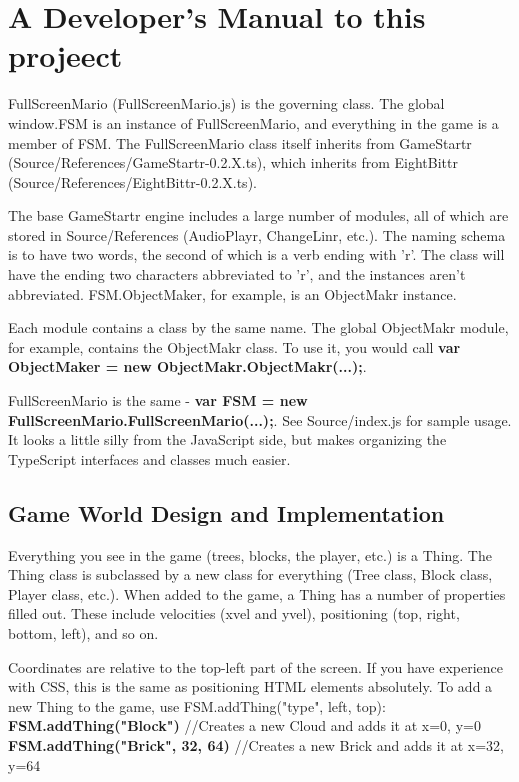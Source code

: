 \documentclass{article}
\begin{document}
\pagebreak
\section{A Developer's Manual to this projeect}
FullScreenMario (FullScreenMario.js) is the governing class. The global window.FSM is an instance of FullScreenMario, and everything in the game is a member of FSM. The FullScreenMario class itself inherits from GameStartr (Source/References/GameStartr-0.2.X.ts), which inherits from EightBittr (Source/References/EightBittr-0.2.X.ts).

The base GameStartr engine includes a large number of modules, all of which are stored in Source/References (AudioPlayr, ChangeLinr, etc.). The naming schema is to have two words, the second of which is a verb ending with 'r'. The class will have the ending two characters abbreviated to 'r', and the instances aren't abbreviated. FSM.ObjectMaker, for example, is an ObjectMakr instance.

Each module contains a class by the same name. The global ObjectMakr module, for example, contains the ObjectMakr class. To use it, you would call \textbf{var ObjectMaker = new ObjectMakr.ObjectMakr(...);}.

FullScreenMario is the same - \textbf{var FSM = new FullScreenMario.FullScreenMario(...);}. See Source/index.js for sample usage. It looks a little silly from the JavaScript side, but makes organizing the TypeScript interfaces and classes much easier.

\subsection{Game World Design and Implementation}

Everything you see in the game (trees, blocks, the player, etc.) is a Thing. The Thing class is subclassed by a new class for everything (Tree class, Block class, Player class, etc.). When added to the game, a Thing has a number of properties filled out. These include velocities (xvel and yvel), positioning (top, right, bottom, left), and so on.

Coordinates are relative to the top-left part of the screen. If you have experience with CSS, this is the same as positioning HTML elements absolutely. To add a new Thing to the game, use FSM.addThing("type", left, top):\\[2\baselineskip]
\textbf{FSM.addThing("Block")} //Creates a new Cloud and adds it at x=0, y=0\\
\textbf{FSM.addThing("Brick", 32, 64)} //Creates a new Brick and adds it at x=32, y=64 \\
\end{document}
